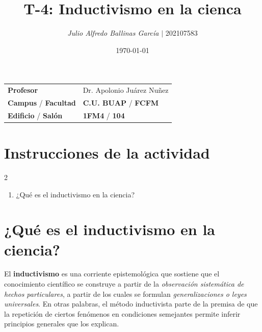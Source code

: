 \documentclass{article}
\title{ \textcolor{Tarawera}{\textbf{T-\textcolor{Sun}{\textbf{4}}}}: \textcolor{Cinnabar}{\textbf{Inductivismo en la cienca}}}
\author{\emph{Julio Alfredo Ballinas García} $\boldsymbol{\mid}$ 202107583}
\date{\today}
\begin{document}
\maketitle



\begin{mybox}
	\noindent\begin{tabular}{@{}ll}
		{\bfseries{Profesor}} & Dr. Apolonio Juárez Nuñez\\
		\textcolor{prussianblue}{\bfseries{Campus}} / \textcolor{trueblue}{\bfseries{Facultad}}  & \textcolor{prussianblue}{\bfseries{C.U. BUAP}} /  \textcolor{trueblue}{\bfseries{FCFM}} \\
		\textcolor{prussianblue}{\bfseries{Edificio}} /  \textcolor{trueblue}{\bfseries{Salón}}    & 	\textcolor{prussianblue}{\bfseries{1FM4}} /  \textcolor{trueblue}{\bfseries{104}}   
	\end{tabular} 
\end{mybox} \vspace{1cm}

\section*{Instrucciones de la actividad}

\setlength{\columnsep}{2cm}
\begin{multicols}{2} %
	\begin{enumerate}[label={{\textcolor{trueblue}{\textbf{Ej}. \arabic*.0}}}, start=1]
		\item ¿Qué es el inductivismo en la ciencia?
	\end{enumerate}
\end{multicols} 

\vspace{2cm}


\tableofcontents  \vspace{2cm}

\section{¿Qué es el inductivismo en la ciencia?} \vspace{0.5cm}

El \textbf{inductivismo} es una corriente epistemológica que sostiene que el conocimiento científico se construye a partir de la \textit{observación sistemática de hechos particulares}, a partir de los cuales se formulan \textit{generalizaciones o leyes universales}. En otras palabras, el método inductivista parte de la premisa de que la repetición de ciertos fenómenos en condiciones semejantes permite inferir principios generales que los explican. 
\end{document}
